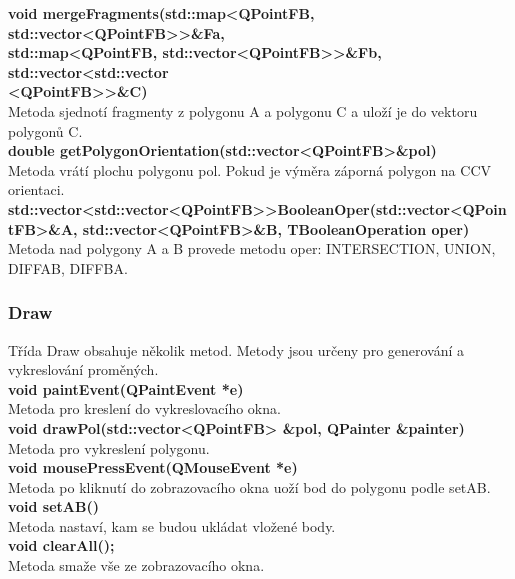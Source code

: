 \documentclass[a4paper, 12pt]{article}
\begin{document}
\textbf{void mergeFragments(std::map\textless QPointFB, std::vector\textless QPointFB\textgreater \textgreater \&Fa,\\std::map\textless QPointFB, std::vector\textless QPointFB\textgreater \textgreater \&Fb, std::vector\textless std::vector\\ \textless QPointFB\textgreater \textgreater \&C)}\\
Metoda sjednotí fragmenty z polygonu A a polygonu C a uloží je do vektoru polygonů C.\\

\textbf{double getPolygonOrientation(std::vector\textless QPointFB\textgreater \&pol)}\\
Metoda vrátí plochu polygonu pol. Pokud je výměra záporná polygon na CCV orientaci.\\

\textbf{std::vector\textless std::vector\textless QPointFB\textgreater \textgreater BooleanOper(std::vector\textless QPointFB\textgreater \&A, std::vector\textless QPointFB\textgreater \&B, TBooleanOperation oper)}\\
Metoda nad polygony A a B provede metodu oper: INTERSECTION, UNION, DIFFAB, DIFFBA.\\


\subsubsection{Draw}
Třída Draw obsahuje několik metod. Metody jsou určeny pro generování a vykreslování proměných.
\\

\textbf{void paintEvent(QPaintEvent *e)}\\
Metoda pro kreslení do vykreslovacího okna.\\

\textbf{void drawPol(std::vector\textless QPointFB> \&pol, QPainter \&painter)}\\
Metoda pro vykreslení polygonu.\\

\textbf{void mousePressEvent(QMouseEvent *e)}\\
Metoda po kliknutí do zobrazovacího okna uoží bod do polygonu podle setAB.\\

\textbf{void setAB()}\\
Metoda nastaví, kam se budou ukládat vložené body.\\

\textbf{void clearAll();}\\
Metoda smaže vše ze zobrazovacího okna.\\
\end{document}
